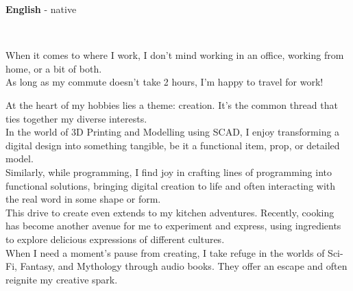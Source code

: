 \documentclass[9pt]{developercv} %
\begin{document}
\begin{minipage}[t]{0.3\textwidth}
	\vspace{-\baselineskip} %

	
	\textbf{English} - native\\


	
	  \\

	\begin{minipage}[t]{0.8\textwidth}
		When it comes to where I work, I don't mind working in an office, working from home, or a bit of both.\\ 

		As long as my commute doesn't take 2 hours,  I'm happy to travel for work!
	\end{minipage}
\end{minipage}
\hfill
\begin{minipage}[t]{0.7\textwidth}
	\vspace{-\baselineskip} %
	
	
	At the heart of my hobbies lies a theme: creation. 
	It's the common thread that ties together my diverse interests. \\

	In the world of 3D Printing and Modelling using SCAD, I enjoy transforming a digital design into something tangible, be it a functional item, prop, or detailed model. \\

	Similarly, while programming, I find joy in crafting lines of programming into functional solutions, bringing digital creation to life and often interacting with the real word in some shape or form. \\

	This drive to create even extends to my kitchen adventures. Recently, cooking has become another avenue for me to experiment and express, using ingredients to explore delicious expressions of different cultures.\\

	When I need a moment's pause from creating, I take refuge in the worlds of Sci-Fi, Fantasy, and Mythology through audio books. They offer an escape and often reignite my creative spark.


\end{minipage}
\end{document}
